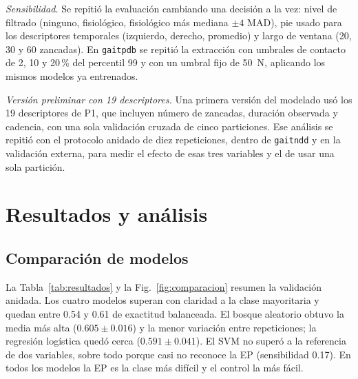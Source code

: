 \documentclass[conference]{IEEEtran}
\newcommand{\gaitndd}{\texttt{gaitndd}}
\newcommand{\gaitpdb}{\texttt{gaitpdb}}
\begin{document}
\textit{Sensibilidad.} Se repitió la evaluación cambiando una decisión a la vez: nivel de filtrado (ninguno, fisiológico, fisiológico más mediana $\pm 4$ MAD), pie usado para los descriptores temporales (izquierdo, derecho, promedio) y largo de ventana (20, 30 y 60 zancadas). En \gaitpdb{} se repitió la extracción con umbrales de contacto de 2, 10 y 20\,\% del percentil 99 y con un umbral fijo de 50~N, aplicando los mismos modelos ya entrenados.

\textit{Versión preliminar con 19 descriptores.} Una primera versión del modelado usó los 19 descriptores de P1, que incluyen número de zancadas, duración observada y cadencia, con una sola validación cruzada de cinco particiones. Ese análisis se repitió con el protocolo anidado de diez repeticiones, dentro de \gaitndd{} y en la validación externa, para medir el efecto de esas tres variables y el de usar una sola partición.

\section{Resultados y análisis}

\subsection{Comparación de modelos}
La Tabla~\ref{tab:resultados} y la Fig.~\ref{fig:comparacion} resumen la validación anidada. Los cuatro modelos superan con claridad a la clase mayoritaria y quedan entre 0.54 y 0.61 de exactitud balanceada. El bosque aleatorio obtuvo la media más alta ($0.605 \pm 0.016$) y la menor variación entre repeticiones; la regresión logística quedó cerca ($0.591 \pm 0.041$). El SVM no superó a la referencia de dos variables, sobre todo porque casi no reconoce la EP (sensibilidad 0.17). En todos los modelos la EP es la clase más difícil y el control la más fácil.
\end{document}
